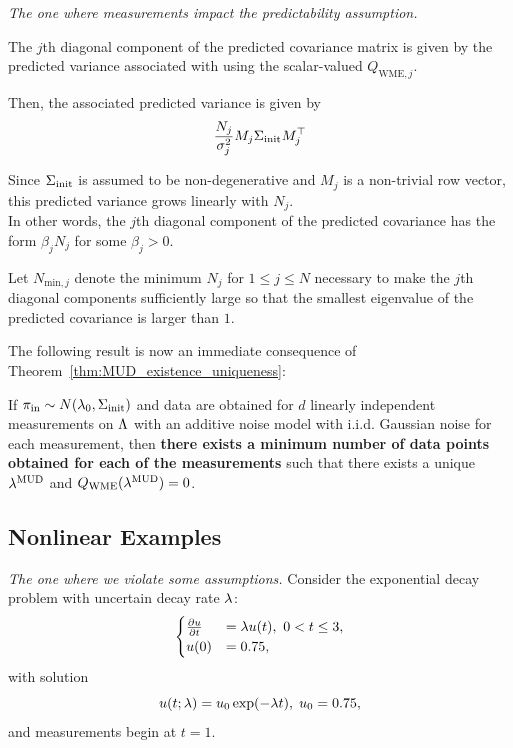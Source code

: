 \begin{frame}[t]{\it The one where measurements impact the predictability assumption.}

The $j$th diagonal component of the predicted covariance matrix is given by the predicted variance associated with using the scalar-valued $Q_{\text{WME},j}$.

Then, the associated predicted variance is given by
\begin{equation}
	\frac{N_j}{\sigma_j^2} M_j\Sigma_\text{init} M_j^\top
\end{equation}

Since $\Sigma_\text{init}$ is assumed to be non-degenerative and $M_j$ is a non-trivial row vector, this predicted variance grows linearly with $N_j$.\\
\vskip 12pt
In other words, the $j$th diagonal component of the predicted covariance has the form $\beta_j N_j$ for some $\beta_j>0$.
\end{frame}


\begin{frame}[t]
\centering
Let $N_{\text{min},j}$ denote the minimum $N_j$ for $1\leq j\leq N$ necessary to make the $j$th diagonal components sufficiently large so that the smallest eigenvalue of the predicted covariance is larger than $1$.

\vskip 12pt
The following result is now an immediate consequence of Theorem~\ref{thm:MUD_existence_uniqueness}:\\

\begin{corollary}\label{cor:MUD_wme}
If $\operatorname*{\pi_{in}} \sim N(\lambda_0,\Sigma_\text{init})$ and data are obtained for $d$ linearly independent measurements on ${\Lambda}$ with an additive noise model with i.i.d. Gaussian noise for each measurement, then {\bf there exists a minimum number of data points obtained for each of the measurements} such that there exists a unique $\lambda^{\text{MUD}}$ and $Q_\text{WME}(\lambda^{\text{MUD}}) = 0$.
\end{corollary}


\end{frame}

\subsection{Nonlinear Examples}


\begin{frame}[t]{\it The one where we violate some assumptions.}
\centering
Consider the exponential decay problem with uncertain decay rate $\lambda$:
$$
\begin{cases}
\frac{\partial u}{\partial t} & = \lambda u(t), \ 0<t\leq 3, \\ u(0) &= 0.75,
\end{cases}
$$
with solution
\begin{equation}
u(t;\lambda) = u_0\exp(-\lambda t), \; u_0 = 0.75 ,
\end{equation}
and measurements begin at $t=1$.
\end{frame}


